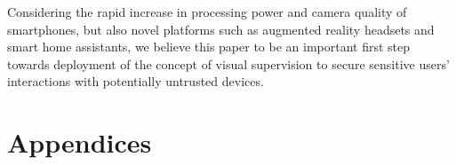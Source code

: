 \documentclass[sigconf, anonymous, balance=false]{acmart}
\begin{document}
Considering the rapid increase in processing power and camera quality of smartphones, but also novel platforms such as augmented reality headsets and smart home assistants, we believe this paper to be an important first step towards deployment of the concept of visual supervision to secure sensitive users' interactions with potentially untrusted devices.





\appendix
\section*{Appendices}

%




%
%
%
\end{document}
